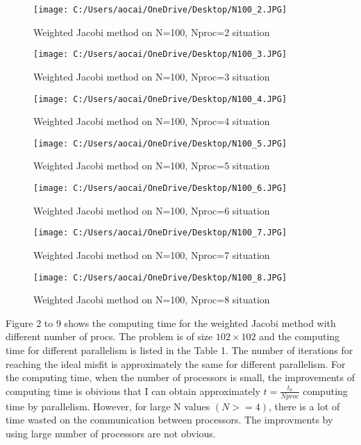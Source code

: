 \documentclass[12pt]{article}
\begin{document}
\begin{figure}[H]
	\centering
	\texttt{[image: C:/Users/aocai/OneDrive/Desktop/N100\_2.JPG]}
	\caption[Optional caption]{Weighted Jacobi method on N=100, Nproc=2 situation}
	\label{fig:N1002}
\end{figure}

\begin{figure}[H]
	\centering
	\texttt{[image: C:/Users/aocai/OneDrive/Desktop/N100\_3.JPG]}
	\caption[Optional caption]{Weighted Jacobi method on N=100, Nproc=3 situation}
	\label{fig:N1003}
\end{figure}

\begin{figure}[H]
	\centering
	\texttt{[image: C:/Users/aocai/OneDrive/Desktop/N100\_4.JPG]}
	\caption[Optional caption]{Weighted Jacobi method on N=100, Nproc=4 situation}
	\label{fig:N1004}
\end{figure}

\begin{figure}[H]
	\centering
	\texttt{[image: C:/Users/aocai/OneDrive/Desktop/N100\_5.JPG]}
	\caption[Optional caption]{Weighted Jacobi method on N=100, Nproc=5 situation}
	\label{fig:N1005}
\end{figure}
\begin{figure}[H]
	\centering
	\texttt{[image: C:/Users/aocai/OneDrive/Desktop/N100\_6.JPG]}
	\caption[Optional caption]{Weighted Jacobi method on N=100, Nproc=6 situation}
	\label{fig:N1006}
\end{figure}
\begin{figure}[H]
	\centering
	\texttt{[image: C:/Users/aocai/OneDrive/Desktop/N100\_7.JPG]}
	\caption[Optional caption]{Weighted Jacobi method on N=100, Nproc=7 situation}
	\label{fig:N1007}
\end{figure}
\begin{figure}[H]
	\centering
	\texttt{[image: C:/Users/aocai/OneDrive/Desktop/N100\_8.JPG]}
	\caption[Optional caption]{Weighted Jacobi method on N=100, Nproc=8 situation}
	\label{fig:N1008}
\end{figure}
Figure 2 to 9 shows the computing time for the weighted Jacobi method with different number of procs. The problem is of size $102 \times 102$ and the computing time for different parallelism is listed in the Table 1. The number of iterations for reaching the ideal misfit is approximately the same for different parallelism. For the computing time, when the number of processors is small, the improvements of computing time is obivious that I can obtain approximately $t = \frac{t_0}{Nproc}$ computing time by parallelism. However, for large N values $(N>=4)$, there is a lot of time wasted on the communication between processors. The improvments by using large number of processors are not obvious.
\end{document}
